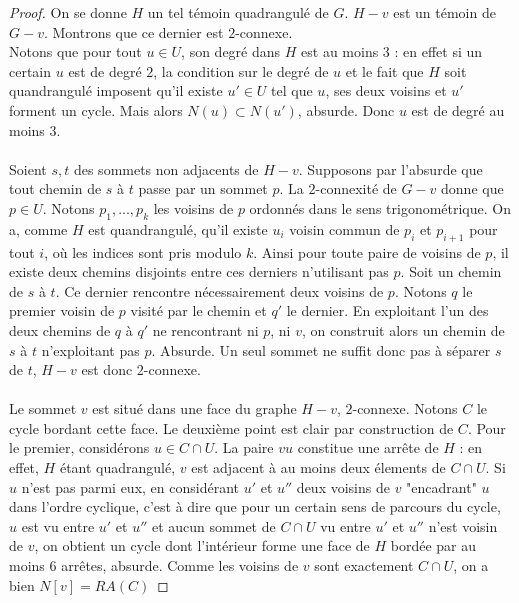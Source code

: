 \documentclass{scrartcl}
\begin{document}
\begin{flushleft}
\begin{proof}
    On se donne $H$ un tel témoin quadrangulé de $G$. $H-v$ est un témoin de $G-v$. Montrons que ce dernier est $2$-connexe.\\
    Notons que pour tout $u \in U$, son degré dans $H$ est au moins $3$ : en effet si un certain $u$ est de degré $2$,
    la condition sur le degré de $u$ et le fait que $H$ soit quandrangulé imposent qu'il existe $u' \in U$ tel que $u$,
    ses deux voisins et $u'$ forment un cycle. Mais alors $N(u) \subset N(u')$, absurde. Donc $u$ est de degré au moins $3$.
    \\~\\
    Soient $s, t$ des sommets non adjacents de $H-v$. Supposons par l'absurde que tout chemin de $s$ à $t$ passe par un sommet
    $p$. La $2$-connexité de $G-v$ donne que $p \in U$. Notons $p_1, ..., p_k$ les voisins de $p$ ordonnés dans le sens trigonométrique.
    On a, comme $H$ est quandrangulé, qu'il existe $u_i$ voisin commun de $p_i$ et $p_{i+1}$ pour tout $i$, où les indices sont
    pris modulo $k$. Ainsi pour toute paire de voisins de $p$, il existe deux chemins disjoints entre ces derniers n'utilisant pas $p$.
    Soit un chemin de $s$ à $t$. Ce dernier rencontre nécessairement deux voisins de $p$. Notons $q$ le premier voisin de $p$
    visité par le chemin et $q'$ le dernier. En exploitant l'un des deux chemins de $q$ à $q'$ ne rencontrant ni $p$, ni $v$,
    on construit alors un chemin de $s$ à $t$ n'exploitant pas $p$. Absurde. Un seul sommet ne suffit donc pas à séparer $s$ de $t$,
    $H-v$ est donc $2$-connexe.
    \\~\\
    Le sommet $v$ est situé dans une face du graphe $H-v$, $2$-connexe. Notons $C$ le cycle bordant cette face. Le deuxième point
    est clair par construction de $C$. Pour le premier, considérons $u \in C \cap U$. La paire $vu$ constitue une arrête de $H$ :
    en effet, $H$ étant quadrangulé, $v$ est adjacent à au moins deux élements de $C \cap U$. Si $u$ n'est pas parmi eux,
    en considérant $u'$ et $u''$ deux voisins de $v$ "encadrant" $u$ dans l'ordre cyclique, c'est à dire que pour un certain
    sens de parcours du cycle, $u$ est vu entre $u'$ et $u''$ et aucun sommet de $C \cap U$ vu entre $u'$ et $u''$ n'est voisin
    de $v$, on obtient un cycle dont l'intérieur forme une face de $H$ bordée par au moins $6$ arrêtes, absurde. Comme les voisins
    de $v$ sont exactement $C \cap U$, on a bien $N[v] = RA(C)$
\end{proof}


\end{flushleft}
\end{document}
